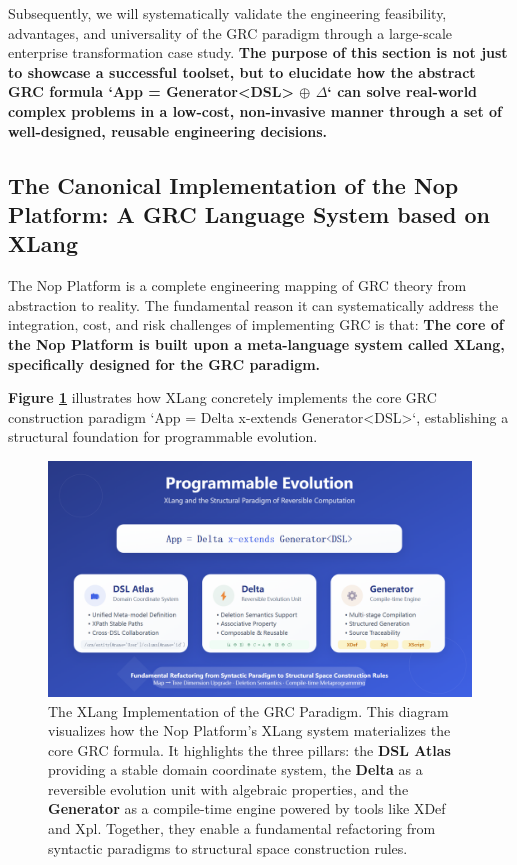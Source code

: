 \documentclass[11pt]{article}
\begin{document}
Subsequently, we will systematically validate the engineering feasibility, advantages, and universality of the GRC paradigm through a large-scale enterprise transformation case study. \textbf{The purpose of this section is not just to showcase a successful toolset, but to elucidate how the abstract GRC formula `App = Generator<DSL> $\oplus$ $\Delta$` can solve real-world complex problems in a low-cost, non-invasive manner through a set of well-designed, reusable engineering decisions.}

\subsection{The Canonical Implementation of the Nop Platform: A GRC Language System based on XLang}

The Nop Platform is a complete engineering mapping of GRC theory from abstraction to reality. The fundamental reason it can systematically address the integration, cost, and risk challenges of implementing GRC is that: \textbf{The core of the Nop Platform is built upon a meta-language system called XLang, specifically designed for the GRC paradigm.}

\textbf{Figure \ref{fig:xlang_paradigm}} illustrates how XLang concretely implements the core GRC construction paradigm `App = Delta x-extends Generator<DSL>`, establishing a structural foundation for programmable evolution.

\begin{figure}[htbp]
    \centering
    \includegraphics[width=\textwidth]{ddd/xlang-paradigm.png}
    \caption{The XLang Implementation of the GRC Paradigm. This diagram visualizes how the Nop Platform's XLang system materializes the core GRC formula. It highlights the three pillars: the \textbf{DSL Atlas} providing a stable domain coordinate system, the \textbf{Delta} as a reversible evolution unit with algebraic properties, and the \textbf{Generator} as a compile-time engine powered by tools like XDef and Xpl. Together, they enable a fundamental refactoring from syntactic paradigms to structural space construction rules.}
    \label{fig:xlang_paradigm}
\end{figure}
\end{document}
